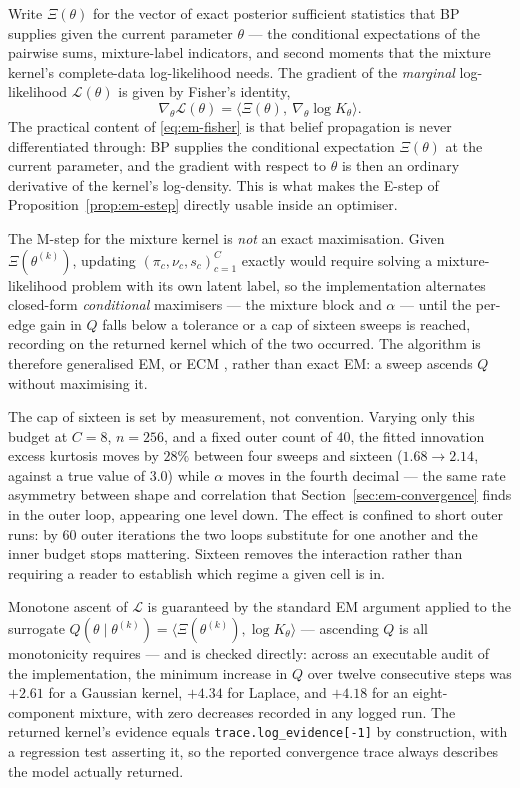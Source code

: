 Write $\Xi(\theta)$ for the vector of exact posterior sufficient statistics
that BP supplies given the current parameter $\theta$ --- the conditional
expectations of the pairwise sums, mixture-label indicators, and second
moments that the mixture kernel's complete-data log-likelihood needs. The
gradient of the \emph{marginal} log-likelihood $\mathcal L(\theta)$ is given
by Fisher's identity,
\begin{equation}
  \nabla_\theta \mathcal L(\theta)
  = \big\langle \Xi(\theta),\ \nabla_\theta \log K_\theta \big\rangle .
  \label{eq:em-fisher}
\end{equation}
The practical content of \eqref{eq:em-fisher} is that belief propagation is
never differentiated through: BP supplies the conditional expectation
$\Xi(\theta)$ at the current parameter, and the gradient with respect to
$\theta$ is then an ordinary derivative of the kernel's log-density. This
is what makes the E-step of Proposition~\ref{prop:em-estep} directly usable
inside an optimiser.

The M-step for the mixture kernel is \emph{not} an exact maximisation. Given
$\Xi(\theta^{(k)})$, updating $(\pi_c,\nu_c,s_c)_{c=1}^C$ exactly would
require solving a mixture-likelihood problem with its own latent label, so
the implementation alternates closed-form \emph{conditional} maximisers ---
the mixture block and $\alpha$ --- until the per-edge gain in $Q$ falls below
a tolerance or a cap of sixteen sweeps is reached, recording on the returned
kernel which of the two occurred. The algorithm is therefore generalised EM,
or ECM \citep{meng1993maximum}, rather than exact EM: a sweep ascends $Q$
without maximising it.

The cap of sixteen is set by measurement, not convention. Varying only this
budget at $C=8$, $n=256$, and a fixed outer count of $40$, the fitted
innovation excess kurtosis moves by $28\%$ between four sweeps and sixteen
($1.68 \to 2.14$, against a true value of $3.0$) while $\alpha$ moves in the
fourth decimal --- the same rate asymmetry between shape and correlation that
Section~\ref{sec:em-convergence} finds in the outer loop, appearing one level
down. The effect is confined to short outer runs: by $60$ outer iterations
the two loops substitute for one another and the inner budget stops
mattering. Sixteen removes the interaction rather than requiring a reader to
establish which regime a given cell is in.

Monotone ascent of $\mathcal L$ is guaranteed by the standard EM argument
applied to the surrogate $Q(\theta \mid \theta^{(k)}) = \langle
\Xi(\theta^{(k)}), \log K_\theta\rangle$ --- ascending $Q$ is all
monotonicity requires --- and is checked directly: across an executable audit
of the implementation, the minimum increase in $Q$ over twelve consecutive
steps was $+2.61$ for a Gaussian kernel, $+4.34$ for Laplace, and $+4.18$
for an eight-component mixture, with zero decreases recorded in any logged
run. The returned kernel's evidence equals
\texttt{trace.log\_evidence[-1]} by construction, with a regression test
asserting it, so the reported convergence trace always describes the model
actually returned.

